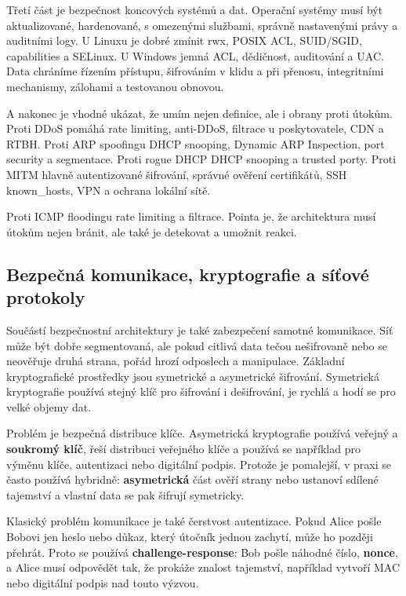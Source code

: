 \documentclass[11pt,a4paper]{article}
\begin{document}
Třetí část je bezpečnost koncových systémů a dat. Operační systémy musí být aktualizované, hardenované, s omezenými službami, správně nastavenými právy a auditními logy. U Linuxu je dobré zmínit rwx, POSIX ACL, SUID/SGID, capabilities a SELinux. U Windows jemná ACL, dědičnost, auditování a UAC. Data chráníme řízením přístupu, šifrováním v klidu a při přenosu, integritními mechanismy, zálohami a testovanou obnovou.

A nakonec je vhodné ukázat, že umím nejen definice, ale i obrany proti útokům. Proti DDoS pomáhá rate limiting, anti-DDoS, filtrace u poskytovatele, CDN a RTBH. Proti ARP spoofingu DHCP snooping, Dynamic ARP Inspection, port security a segmentace. Proti rogue DHCP DHCP snooping a trusted porty. Proti MITM hlavně autentizované šifrování, správné ověření certifikátů, SSH known\_hosts, VPN a ochrana lokální sítě.

Proti ICMP floodingu rate limiting a filtrace. Pointa je, že architektura musí útokům nejen bránit, ale také je detekovat a umožnit reakci.

\subsection*{Bezpečná komunikace, kryptografie a síťové protokoly}

Součástí bezpečnostní architektury je také zabezpečení samotné komunikace. Síť může být dobře segmentovaná, ale pokud citlivá data tečou nešifrovaně nebo se neověřuje druhá strana, pořád hrozí odposlech a manipulace. Základní kryptografické prostředky jsou symetrické a asymetrické šifrování. Symetrická kryptografie používá stejný klíč pro šifrování i dešifrování, je rychlá a hodí se pro velké objemy dat.

Problém je bezpečná distribuce klíče. Asymetrická kryptografie používá veřejný a \textbf{soukromý klíč}, řeší distribuci veřejného klíče a používá se například pro výměnu klíče, autentizaci nebo digitální podpis. Protože je pomalejší, v praxi se často používá hybridně: \textbf{asymetrická} část ověří strany nebo ustanoví sdílené tajemství a vlastní data se pak šifrují symetricky.

Klasický problém komunikace je také čerstvost autentizace. Pokud Alice pošle Bobovi jen heslo nebo důkaz, který útočník jednou zachytí, může ho později přehrát. Proto se používá \textbf{challenge-response}: Bob pošle náhodné číslo, \textbf{nonce}, a Alice musí odpovědět tak, že prokáže znalost tajemství, například vytvoří MAC nebo digitální podpis nad touto výzvou.
\end{document}
